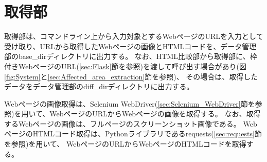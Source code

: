 \section{取得部}\label{sec:Web_data_get_section}
取得部は、コマンドライン上から入力対象とするWebページのURLを入力として受け取り、URLから取得したWebページの画像とHTMLコードを、データ管理部のbase\_dirディレクトリに出力する。
なお、HTML比較部から取得部に、枠付きWebページのURL(\ref{sec:Flask}節を参照)を渡して呼び出す場合があり(図\ref{fig:System}と\ref{sec:Affected_area_extraction}節を参照)、
その場合は、取得したデータをデータ管理部のdiff\_dirディレクトリに出力する。
\par
Webページの画像取得は、Selenium WebDriver(\ref{sec:Selenium_WebDriver}節を参照)を用いて、WebページのURLからWebページの画像を取得する。
なお、取得するWebページの画像は、フルページのスクリーンショット画像である。
WebページのHTMLコード取得は、Pythonライブラリであるrequests(\ref{sec:requests}節を参照)を用いて、
WebページのURLからWebページのHTMLコードを取得する。

